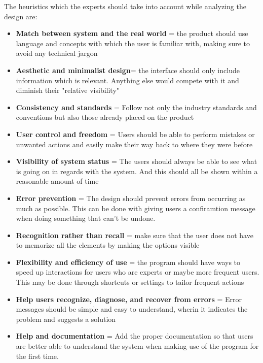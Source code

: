 \documentclass{article}
\begin{document}
    The heuristics which the experts should take into account while analyzing the design are:
    \begin{itemize}
        \item \textbf{Match between system and the real world} = the product should use language and concepts with which the user is familiar with, making sure to avoid any technical jargon  \citep{2Heuristic}
        \item \textbf{Aesthetic and minimalist design}= the interface should only include information which is relevant. Anything else would compete with it and diminish their "relative visibility"\citep{MainHeuristic}
        \item \textbf{Consistency and standards} = Follow not only the industry standards and conventions but also those already placed on the product \citep{MainHeuristic}
        \item \textbf{User control and freedom} = Users should be able to perform mistakes or unwanted actions and easily make their way back to where they were before  \citep{MainHeuristic}
        \item \textbf{Visibility of system status} = The users should always be able to see what is going on in regards with the system. And this should all be shown within a reasonable amount of time \citep{MainHeuristic}
        \item \textbf{Error prevention} = The design should prevent errors from occurring as much as possible. This can be done with giving users a confiramtion message when doing something that can't be undone.   \citep{MainHeuristic}
        \item \textbf{Recognition rather than recall} = make sure that the user does not have to memorize all the elements by making the options visible  \citep{MainHeuristic}
        \item \textbf{Flexibility and efficiency of use} = the program should have ways to speed up interactions for users who are experts or maybe more frequent users. This may be done through shortcuts or settings to tailor frequent actions  \citep{MainHeuristic}
        \item \textbf{Help users recognize, diagnose, and recover from errors} = Error messages should be simple and easy to understand, wherin it indicates the problem and suggests a solution \citep{MainHeuristic}
        \item \textbf{Help and documentation} = Add the proper documentation so that users are better able to understand the system when making use of the program for the first time. \citep{MainHeuristic}
    \end{itemize}
\end{document}
